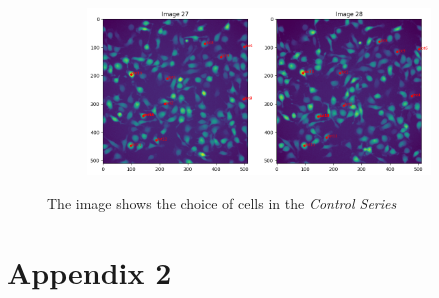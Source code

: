 \documentclass{article}
\begin{document}
\begin{figure}[h!]
\begin{subfigure}[b]{0.5\linewidth}
        \caption{}
    \end{subfigure}%
    \begin{subfigure}[b]{0.5\linewidth}
        \centering
        \includegraphics[width=\linewidth]{Report/RImages/Traces_Growth/trace-b28.png}
        \caption{}
    \end{subfigure}
    \caption{The image shows the choice of cells in the \emph{Control Series}}
    \label{fig:ChoiceofCells-ControlSeries}
\end{figure}

\newpage
\section*{Appendix 2}




\end{document}
